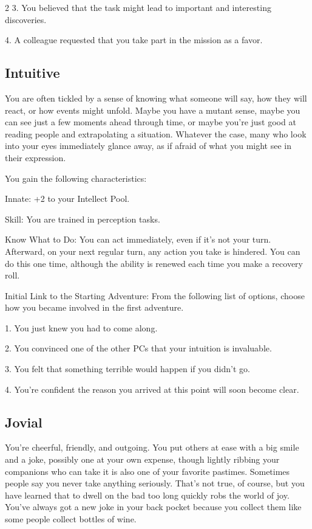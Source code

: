 \begin{multicols}{2}
3. You believed that the task might lead to important and interesting discoveries.

4. A colleague requested that you take part in the mission as a favor.

\subsection{Intuitive}

You are often tickled by a sense of knowing what someone will say, how they will react, or how events might unfold. Maybe you have a mutant sense, maybe you can see just a few moments ahead through time, or maybe you’re just good at reading people and extrapolating a situation. Whatever the case, many who look into your eyes immediately glance away, as if afraid of what you might see in their expression.

You gain the following characteristics:

Innate: +2 to your Intellect Pool.

Skill: You are trained in perception tasks.

Know What to Do: You can act immediately, even if it’s not your turn. Afterward, on your next regular turn, any action you take is hindered. You can do this one time, although the ability is renewed each time you make a recovery roll.

Initial Link to the Starting Adventure: From the following list of options, choose how you became involved in the first adventure.

1. You just knew you had to come along.

2. You convinced one of the other PCs that your intuition is invaluable.

3. You felt that something terrible would happen if you didn’t go.

4. You’re confident the reason you arrived at this point will soon become clear.

\subsection{Jovial}

You’re cheerful, friendly, and outgoing. You put others at ease with a big smile and a joke, possibly one at your own expense, though lightly ribbing your companions who can take it is also one of your favorite pastimes. Sometimes people say you never take anything seriously. That’s not true, of course, but you have learned that to dwell on the bad too long quickly robs the world of joy. You’ve always got a new joke in your back pocket because you collect them like some people collect bottles of wine.


\end{multicols}
